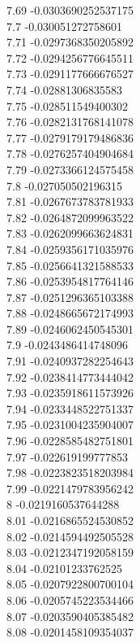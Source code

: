 {7.69	-0.0303690252537175\\
7.7	-0.030051272758601\\
7.71	-0.0297368350205892\\
7.72	-0.0294256776645511\\
7.73	-0.0291177666676527\\
7.74	-0.02881306835583\\
7.75	-0.028511549400302\\
7.76	-0.0282131768141078\\
7.77	-0.0279179179486836\\
7.78	-0.0276257404904684\\
7.79	-0.0273366124575458\\
7.8	-0.027050502196315\\
7.81	-0.0267673783781933\\
7.82	-0.0264872099963522\\
7.83	-0.0262099663624831\\
7.84	-0.0259356171035976\\
7.85	-0.0256641321588533\\
7.86	-0.0253954817764146\\
7.87	-0.0251296365103388\\
7.88	-0.0248665672174993\\
7.89	-0.0246062450545301\\
7.9	-0.0243486414748096\\
7.91	-0.0240937282254643\\
7.92	-0.0238414773444042\\
7.93	-0.0235918611573926\\
7.94	-0.0233448522751337\\
7.95	-0.0231004235904007\\
7.96	-0.0228585482751801\\
7.97	-0.022619199777853\\
7.98	-0.0223823518203984\\
7.99	-0.0221479783956242\\
8	-0.0219160537644288\\
8.01	-0.0216865524530852\\
8.02	-0.0214594492505528\\
8.03	-0.0212347192058159\\
8.04	-0.02101233762525\\
8.05	-0.0207922800700104\\
8.06	-0.0205745223534466\\
8.07	-0.0203590405385482\\
8.08	-0.0201458109354037\\
}
